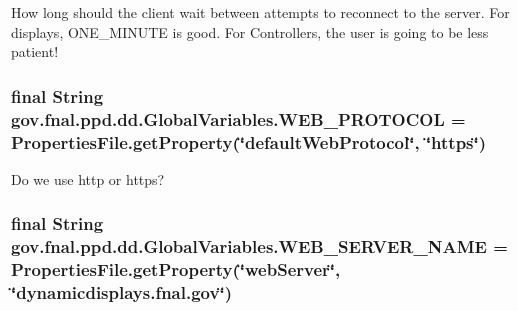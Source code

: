 How long should the client wait between attempts to reconnect to the server. For displays, O\-N\-E\-\_\-\-M\-I\-N\-U\-T\-E is good. For Controllers, the user is going to be less patient! \hypertarget{classgov_1_1fnal_1_1ppd_1_1dd_1_1GlobalVariables_aa3bf05d555f0c3489c60664ae54a2480}{
\subsubsection[{W\-E\-B\-\_\-\-P\-R\-O\-T\-O\-C\-O\-L}]{\setlength{\rightskip}{0pt plus 5cm}final String gov.\-fnal.\-ppd.\-dd.\-Global\-Variables.\-W\-E\-B\-\_\-\-P\-R\-O\-T\-O\-C\-O\-L = Properties\-File.\-get\-Property(\char`\"{}default\-Web\-Protocol\char`\"{}, \char`\"{}https\char`\"{})\hspace{0.3cm}{\ttfamily [static]}}}\label{classgov_1_1fnal_1_1ppd_1_1dd_1_1GlobalVariables_aa3bf05d555f0c3489c60664ae54a2480}
Do we use http or https? \hypertarget{classgov_1_1fnal_1_1ppd_1_1dd_1_1GlobalVariables_af5ffb15826513fabba402ec017edbc70}{
\subsubsection[{W\-E\-B\-\_\-\-S\-E\-R\-V\-E\-R\-\_\-\-N\-A\-M\-E}]{\setlength{\rightskip}{0pt plus 5cm}final String gov.\-fnal.\-ppd.\-dd.\-Global\-Variables.\-W\-E\-B\-\_\-\-S\-E\-R\-V\-E\-R\-\_\-\-N\-A\-M\-E = Properties\-File.\-get\-Property(\char`\"{}web\-Server\char`\"{}, \char`\"{}dynamicdisplays.\-fnal.\-gov\char`\"{})\hspace{0.3cm}{\ttfamily [static]}}}\label{classgov_1_1fnal_1_1ppd_1_1dd_1_1GlobalVariables_af5ffb15826513fabba402ec017edbc70}
